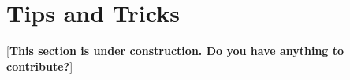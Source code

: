 \section{Tips and Tricks}
\label{tips}

[{\bf This section is under construction.  Do you have anything to contribute?}]